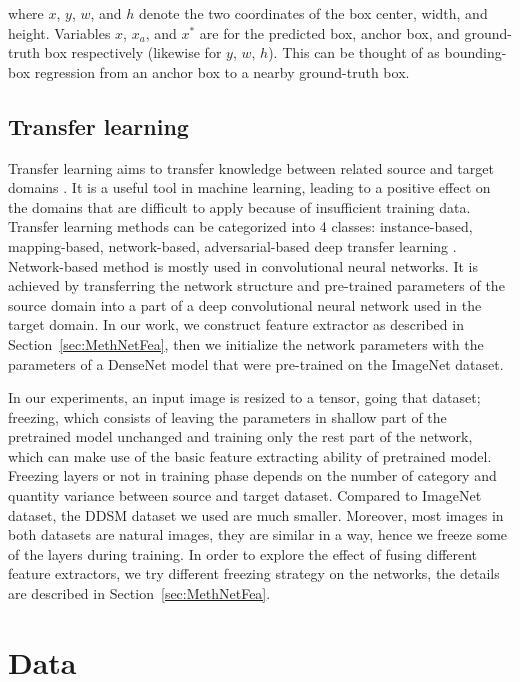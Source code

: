 \documentclass[12pt]{article}
\begin{document}
where $x$, $y$, $w$, and $h$ denote the two 
coordinates of the box center, width, and 
height. Variables $x$, $x_a$, and $x^*$ are 
for the predicted box, anchor box, and 
ground-truth box respectively (likewise for 
$y$, $w$, $h$). This can be thought of as 
bounding-box regression from an anchor box 
to a nearby ground-truth box.

\subsection{Transfer learning}
\label{sec:MethTL}

Transfer learning aims to transfer knowledge 
between related source and target domains
\citep{Pan2010}.
It is a useful tool in machine learning, 
leading to a positive effect on the domains 
that are difficult to apply because of 
insufficient training data. Transfer learning 
methods can be categorized into 4 classes: 
instance-based, mapping-based, network-based,
adversarial-based deep transfer learning
\citep{Tan2018}.
Network-based method is mostly used in 
convolutional neural networks. It is achieved 
by transferring the network structure and 
pre-trained parameters of the source domain into 
a part of a deep convolutional neural network 
used in the target domain. In our work, 
we construct feature extractor as 
described in Section~\ref{sec:MethNetFea}, 
then we initialize the network parameters 
with the parameters of a DenseNet model 
that were pre-trained on the ImageNet dataset.

In our experiments, an input image is 
resized to a tensor, going that dataset; 
freezing, which consists of leaving the 
parameters in shallow part of the 
pretrained model unchanged and training 
only the rest part of the network, which can 
make use of the basic feature extracting 
ability of pretrained model. Freezing layers 
or not in training phase depends on the 
number of category and quantity variance 
between source and target dataset. 
Compared to ImageNet dataset, the DDSM 
dataset we used are much smaller. 
Moreover, most images in both datasets 
are natural images, they are similar in 
a way, hence we freeze some of the layers 
during training. In order to explore the 
effect of fusing different feature extractors, 
we try different freezing strategy on the 
networks, the details are described in 
Section~\ref{sec:MethNetFea}. 

\section{Data}
\label{sec:Data}
\end{document}
